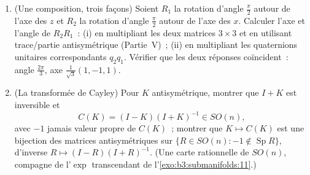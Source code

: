 \begin{problem}
\begin{enumerate}[resume]
  \item (Une composition, trois façons) Soient $R_1$ la
        rotation d'angle $\frac\pi2$ autour de l'axe des $z$
        et $R_2$ la rotation d'angle $\frac\pi2$ autour de
        l'axe des $x$. Calculer l'axe et l'angle de
        $R_2R_1$~: (i) en multipliant les deux matrices
        $3\times3$ et en utilisant trace/partie
        antisymétrique (Partie~V)~; (ii) en multipliant les
        quaternions unitaires correspondants $q_2q_1$.
        Vérifier que les deux réponses coïncident~: angle
        $\frac{2\pi}3$, axe $\frac1{\sqrt3}(1, -1, 1)$.
  \item (La transformée de Cayley) Pour $K$ antisymétrique,
        montrer que $I + K$ est inversible et
        \[
        C(K) = (I - K)(I + K)^{-1} \in SO(n),
        \]
        avec $-1$ jamais valeur propre de $C(K)$~; montrer
        que $K \mapsto C(K)$ est une bijection des matrices
        antisymétriques sur $\{R \in SO(n) : -1 \notin
        \operatorname{Sp}R\}$, d'inverse $R \mapsto (I -
        R)(I + R)^{-1}$. (Une carte rationnelle de $SO(n)$,
        compagne de l'$\exp$ transcendant de
        l'\cref{exo:b3:submanifolds:11}.)
\end{enumerate}
\end{problem}
